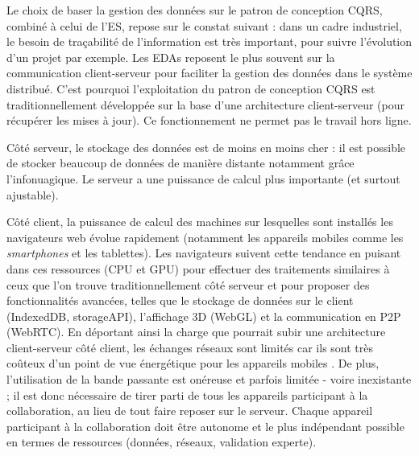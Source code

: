 %

Le choix de baser la gestion des données sur le patron de conception \gls{CQRS}, 
combiné à celui de l'\gls{ES}, repose sur le constat suivant : dans un cadre industriel, le 
besoin de traçabilité de l'information est très important, pour suivre l'évolution d'un 
projet par exemple. 
Les \glspl{EDA} reposent le plus souvent sur 
la communication client-serveur pour faciliter la gestion des données dans le 
système distribué. C'est pourquoi l'exploitation du patron de conception 
\gls{CQRS} est traditionnellement développée sur la base d'une architecture client-serveur (pour récupérer les mises à jour). 
Ce fonctionnement ne permet pas le travail hors ligne.

Côté serveur, le stockage des données est de moins en moins cher : il est possible de 
stocker beaucoup de données de manière distante notamment 
grâce l'infonuagique. Le serveur a une puissance de calcul plus importante (et surtout ajustable).

Côté client, la puissance de calcul des machines sur lesquelles sont installés les 
navigateurs web évolue rapidement (notamment les appareils mobiles comme les 
\textit{smartphones} et les tablettes). Les navigateurs suivent cette tendance en 
puisant dans ces ressources (CPU et GPU) pour effectuer des traitements similaires à ceux que 
l'on trouve traditionnellement côté serveur et pour proposer des fonctionnalités 
avancées, telles que le stockage de données sur le client (IndexedDB, 
storageAPI), l'affichage \gls{3D} (WebGL) et la communication en 
\gls{P2P} 
(\gls{WebRTC}). En déportant ainsi la charge que pourrait subir une architecture 
client-serveur côté client, les échanges réseaux sont limités car ils 
sont très coûteux d'un point de vue énergétique pour les appareils mobiles 
\cite{Koskela2015}. De plus, l'utilisation de la bande passante est onéreuse et 
parfois limitée - voire inexistante ; il est donc nécessaire de tirer parti de tous les 
appareils participant à la collaboration, au lieu de tout faire reposer sur le serveur. 
Chaque appareil participant à la collaboration doit être autonome et le plus 
indépendant possible en termes de ressources (données, réseaux, validation 
experte). 

